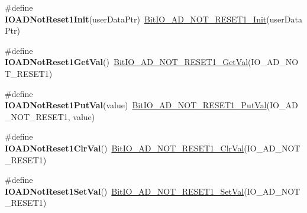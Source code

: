 \begin{DoxyCompactItemize}
\item 
\hypertarget{group___func_ala_gadae7cf293fef6bd24b8034183f0447c1}{\#define {\bfseries I\-O\-A\-D\-Not\-Reset1\-Init}(user\-Data\-Ptr)~\hyperlink{group___bit_i_o___a_d___n_o_t___r_e_s_e_t1__module_gab7895fb466d4733d904fc3e8494eb986}{Bit\-I\-O\-\_\-\-A\-D\-\_\-\-N\-O\-T\-\_\-\-R\-E\-S\-E\-T1\-\_\-\-Init}(user\-Data\-Ptr)}\label{group___func_ala_gadae7cf293fef6bd24b8034183f0447c1}

\item 
\hypertarget{group___func_ala_gafc9a24b8f4847b36deb9d8fe294322e6}{\#define {\bfseries I\-O\-A\-D\-Not\-Reset1\-Get\-Val}()~\hyperlink{group___bit_i_o___a_d___n_o_t___r_e_s_e_t1__module_gae70d3f55ba2a5e7aced140db02d32535}{Bit\-I\-O\-\_\-\-A\-D\-\_\-\-N\-O\-T\-\_\-\-R\-E\-S\-E\-T1\-\_\-\-Get\-Val}(I\-O\-\_\-\-A\-D\-\_\-\-N\-O\-T\-\_\-\-R\-E\-S\-E\-T1)}\label{group___func_ala_gafc9a24b8f4847b36deb9d8fe294322e6}

\item 
\hypertarget{group___func_ala_ga31d177c2642851fbbc6268c66e9150cd}{\#define {\bfseries I\-O\-A\-D\-Not\-Reset1\-Put\-Val}(value)~\hyperlink{group___bit_i_o___a_d___n_o_t___r_e_s_e_t1__module_gac0549871ba4d8886adf1ee204b330d4e}{Bit\-I\-O\-\_\-\-A\-D\-\_\-\-N\-O\-T\-\_\-\-R\-E\-S\-E\-T1\-\_\-\-Put\-Val}(I\-O\-\_\-\-A\-D\-\_\-\-N\-O\-T\-\_\-\-R\-E\-S\-E\-T1, value)}\label{group___func_ala_ga31d177c2642851fbbc6268c66e9150cd}

\item 
\hypertarget{group___func_ala_ga51d93d89cabc49a10d594f56c854e682}{\#define {\bfseries I\-O\-A\-D\-Not\-Reset1\-Clr\-Val}()~\hyperlink{group___bit_i_o___a_d___n_o_t___r_e_s_e_t1__module_ga4049d8600c4d9d766fbd3bdd8341d8f3}{Bit\-I\-O\-\_\-\-A\-D\-\_\-\-N\-O\-T\-\_\-\-R\-E\-S\-E\-T1\-\_\-\-Clr\-Val}(I\-O\-\_\-\-A\-D\-\_\-\-N\-O\-T\-\_\-\-R\-E\-S\-E\-T1)}\label{group___func_ala_ga51d93d89cabc49a10d594f56c854e682}

\item 
\hypertarget{group___func_ala_gac3f0d7800d6c77e94aa72cb4e826ee38}{\#define {\bfseries I\-O\-A\-D\-Not\-Reset1\-Set\-Val}()~\hyperlink{group___bit_i_o___a_d___n_o_t___r_e_s_e_t1__module_ga2311689c90571a1c7a93ec176f577fb5}{Bit\-I\-O\-\_\-\-A\-D\-\_\-\-N\-O\-T\-\_\-\-R\-E\-S\-E\-T1\-\_\-\-Set\-Val}(I\-O\-\_\-\-A\-D\-\_\-\-N\-O\-T\-\_\-\-R\-E\-S\-E\-T1)}\label{group___func_ala_gac3f0d7800d6c77e94aa72cb4e826ee38}

\end{DoxyCompactItemize}
